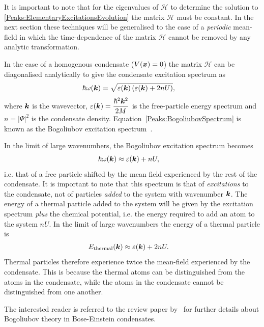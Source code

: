 It is important to note that for the eigenvalues of $\mathcal{H}$ to determine the solution to \eqref{Peaks:ElementaryExcitationsEvolution} the matrix $\mathcal{H}$ must be constant. In the next section these techniques will be generalised to the case of a \emph{periodic} mean-field in which the time-dependence of the matrix $\mathcal{H}$ cannot be removed by any analytic transformation.

In the case of a homogenous condensate ($V(\bm{x}) = 0$) the matrix $\mathcal{H}$ can be diagonalised analytically to give the condensate excitation spectrum as
\begin{align}
    \hbar \omega(\vect{k}) &= \sqrt{\varepsilon(\vect{k})\left(\varepsilon(\vect{k}) + 2 n U \right)},
    \label{Peaks:BogoliubovSpectrum}
\end{align}
where $\bm{k}$ is the wavevector, $\displaystyle \varepsilon(\bm{k}) = \frac{\hbar^2 \bm{k}^2}{2 M}$ is the free-particle energy spectrum and $n = \big|\Psi \big|^2$ is the condensate density. Equation~\eqref{Peaks:BogoliubovSpectrum} is known as the Bogoliubov excitation spectrum~\citep{Bogoliubov:1947}.  

In the limit of large wavenumbers, the Bogoliubov excitation spectrum becomes
\begin{align}
    \hbar \omega(\bm{k}) &\approx \varepsilon(\bm{k}) + n U,
\end{align}
i.e. that of a free particle shifted by the mean field experienced by the rest of the condensate.  It is important to note that this spectrum is that of \emph{excitations} to the condensate, not of particles \emph{added} to the system with wavenumber $\bm{k}$.  The energy of a thermal particle added to the system will be given by the excitation spectrum \emph{plus} the chemical potential, i.e. the energy required to add an atom to the system $n U$.  In the limit of large wavenumbers the energy of a thermal particle is
\begin{align}
    E_\text{thermal}(\vect{k}) &\approx \varepsilon(\vect{k}) + 2 n U.
    \label{Peaks:ThermalParticleEnergySpectrum}
\end{align}
Thermal particles therefore experience twice the mean-field experienced by the condensate.  This is because the thermal atoms can be distinguished from the atoms in the condensate, while the atoms in the condensate cannot be distinguished from one another.

The interested reader is referred to the review paper by~\citet{Ozeri:2005} for further details about Bogoliubov theory in Bose-Einstein condensates.

